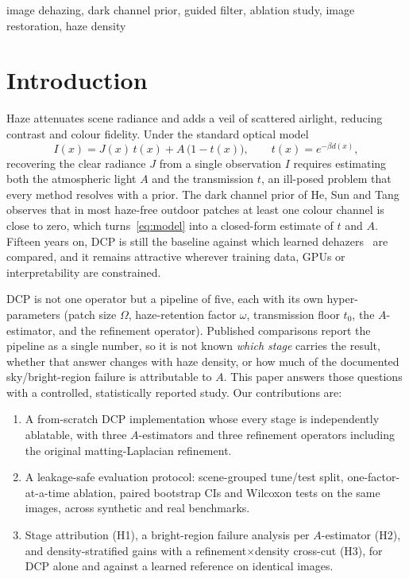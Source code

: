 \documentclass[conference]{IEEEtran}
\begin{document}
\begin{IEEEkeywords}
image dehazing, dark channel prior, guided filter, ablation study, image restoration, haze density
\end{IEEEkeywords}

\section{Introduction}
Haze attenuates scene radiance and adds a veil of scattered airlight, reducing contrast and colour fidelity. Under the
standard optical model~\cite{narasimhan2002}
\begin{equation}
  I(x) = J(x)\,t(x) + A\,\bigl(1 - t(x)\bigr),\qquad t(x) = e^{-\beta d(x)},
  \label{eq:model}
\end{equation}
recovering the clear radiance $J$ from a single observation $I$ requires estimating both the atmospheric light $A$ and the
transmission $t$, an ill-posed problem that every method resolves with a prior. The dark channel prior of He, Sun and
Tang~\cite{he2009,he2011} observes that in most haze-free outdoor patches at least one colour channel is close to zero,
which turns~\eqref{eq:model} into a closed-form estimate of $t$ and $A$. Fifteen years on, DCP is still the baseline
against which learned dehazers~\cite{cai2016,ren2016,li2017,qin2020,song2023} are compared, and it remains attractive
wherever training data, GPUs or interpretability are constrained.

DCP is not one operator but a pipeline of five, each with its own hyper-parameters (patch size $\Omega$, haze-retention
factor $\omega$, transmission floor $t_0$, the $A$-estimator, and the refinement operator). Published comparisons report the
pipeline as a single number, so it is not known \emph{which stage} carries the result, whether that answer changes with
haze density, or how much of the documented sky/bright-region failure is attributable to $A$. This paper answers those
questions with a controlled, statistically reported study. Our contributions are:
\begin{enumerate}
  \item A from-scratch DCP implementation whose every stage is independently ablatable, with three $A$-estimators and three
        refinement operators including the original matting-Laplacian refinement.
  \item A leakage-safe evaluation protocol: scene-grouped tune/test split, one-factor-at-a-time ablation, paired bootstrap
        CIs and Wilcoxon tests on the same images, across synthetic and real benchmarks.
  \item Stage attribution (H1), a bright-region failure analysis per $A$-estimator (H2), and density-stratified gains with a
        refinement$\times$density cross-cut (H3), for DCP alone and against a learned reference on identical images.
\end{enumerate}
\end{document}
